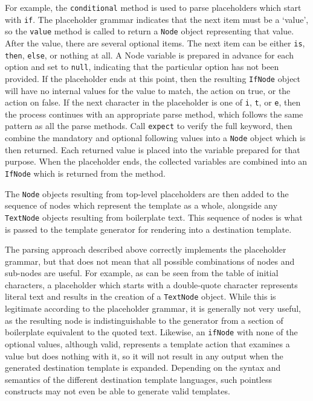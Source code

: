 For example, the \verb!conditional! method is used to parse placeholders which start with \verb!if!. The placeholder grammar indicates that the next item must be a `value', so the \verb!value! method is called to return a \verb!Node! object representing that value. After the value, there are several optional items. The next item can be either \verb!is!, \verb!then!, \verb!else!, or nothing at all. A Node variable is prepared in advance for each option and set to \verb!null!, indicating that the particular option has not been provided. If the placeholder ends at this point, then the resulting \verb!IfNode! object will have no internal values for the value to match, the action on true, or the action on false. If the next character in the placeholder is one of \verb!i!, \verb!t!, or \verb!e!, then the process continues with an appropriate parse method, which follows the same pattern as all the parse methods. Call \verb!expect! to verify the full keyword, then combine the mandatory and optional following values into a \verb!Node! object which is then returned. Each returned value is placed into the variable prepared for that purpose. When the placeholder ends, the collected variables are combined into an \verb!IfNode! which is returned from the method.

The \verb!Node! objects resulting from top-level placeholders are then added to the sequence of nodes which represent the template as a whole, alongside any \verb!TextNode! objects resulting from boilerplate text. This sequence of nodes is what is passed to the template generator for rendering into a destination template.

The parsing approach described above correctly implements the placeholder grammar, but that does not mean that all possible combinations of nodes and sub-nodes are useful.  For example, as can be seen from the table of initial characters, a placeholder which starts with a double-quote character represents literal text and results in the creation of a \verb!TextNode! object. While this is legitimate according to the placeholder grammar, it is generally not very useful, as the resulting node is indistinguishable to the generator from a section of boilerplate equivalent to the quoted text. Likewise, an \verb!ifNode! with none of the optional values, although valid, represents a template action that examines a value but does nothing with it, so it will not result in any output when the generated destination template is expanded. Depending on the syntax and semantics of the different destination template languages, such pointless constructs may not even be able to generate valid templates.


